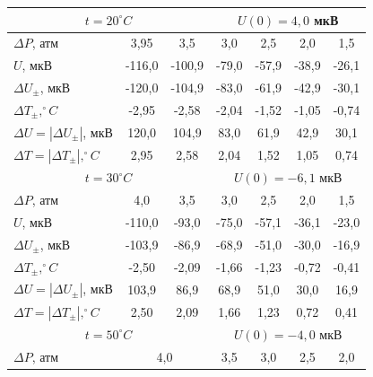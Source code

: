 \documentclass[a4paper, 12pt]{article}
\begin{document}
\begin{enumerate}
\begin{table}[H]
	\centering
	\begin{tabular}{|l|c|c|c|c|c|c|}
		\hline
		\multicolumn{3}{|c|}{$t = 20^\circ C$}                                & \multicolumn{4}{c|}{$U(0) = 4,0$ мкВ}  \\ \hline
		$\Delta P$, атм                         & 3,95          & 3,5         & 3,0      & 2,5     & 2,0     & 1,5     \\ \hline
		$U$, мкВ                                & -116,0        & -100,9      & -79,0    & -57,9   & -38,9   & -26,1   \\ \hline
		$\Delta U_{\pm}$, мкВ                   & -120,0        & -104,9      & -83,0    & -61,9   & -42,9   & -30,1   \\ \hline
		$\Delta T_{\pm},^\circ C$               & -2,95         & -2,58       & -2,04    & -1,52   & -1,05   & -0,74   \\ \hline
		$\Delta U = |\Delta U_{\pm}|$, мкВ      & 120,0         & 104,9       & 83,0     & 61,9    & 42,9    & 30,1    \\ \hline
		$\Delta T = |\Delta T_{\pm}|, ^\circ C$ & 2,95          & 2,58        & 2,04     & 1,52    & 1,05    & 0,74    \\ \hline
		\multicolumn{3}{|c|}{$t = 30^\circ C$}                                & \multicolumn{4}{c|}{$U(0) = -6,1$ мкВ} \\ \hline
		$\Delta P$, атм                         & 4,0           & 3,5         & 3,0      & 2,5     & 2,0     & 1,5     \\ \hline
		$U$, мкВ                                & -110,0        & -93,0       & -75,0    & -57,1   & -36,1   & -23,0   \\ \hline
		$\Delta U_{\pm}$, мкВ                   & -103,9        & -86,9       & -68,9    & -51,0   & -30,0   & -16,9   \\ \hline
		$\Delta T_{\pm},^\circ C$               & -2,50         & -2,09       & -1,66    & -1,23   & -0,72   & -0,41   \\ \hline
		$\Delta U = |\Delta U_{\pm}|$, мкВ      & 103,9         & 86,9        & 68,9     & 51,0    & 30,0    & 16,9    \\ \hline
		$\Delta T = |\Delta T_{\pm}|, ^\circ C$ & 2,50          & 2,09        & 1,66     & 1,23    & 0,72    & 0,41    \\ \hline
		\multicolumn{3}{|c|}{$t = 50^\circ C$}                                & \multicolumn{4}{c|}{$U(0) = -4,0$ мкВ} \\ \hline
		$\Delta P$, атм                         & \multicolumn{2}{c|}{4,0}    & 3,5      & 3,0     & 2,5     & 2,0     \\ \hline

\end{tabular}
\end{table}
\end{enumerate}
\end{document}
